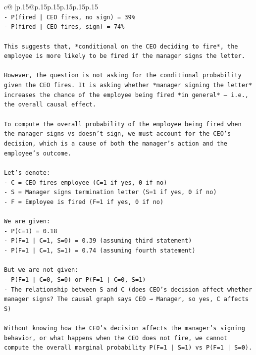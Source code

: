 \documentclass{article}
\begin{document}
{\begin{supertabular}{c@{$\;$}|p{.15\linewidth}@{}p{.15\linewidth}p{.15\linewidth}p{.15\linewidth}p{.15\linewidth}p{.15\linewidth}}
{{{\\ 
\texttt{{-} P(fired | CEO fires, no sign) = 39\%  } \\
\texttt{{-} P(fired | CEO fires, sign) = 74\%} \\
\\ 
\texttt{This suggests that, *conditional on the CEO deciding to fire*, the employee is more likely to be fired if the manager signs the letter.} \\
\\ 
\texttt{However, the question is not asking for the conditional probability given the CEO fires. It is asking whether *manager signing the letter* increases the chance of the employee being fired *in general* — i.e., the overall causal effect.} \\
\\ 
\texttt{To compute the overall probability of the employee being fired when the manager signs vs doesn’t sign, we must account for the CEO’s decision, which is a cause of both the manager’s action and the employee’s outcome.} \\
\\ 
\texttt{Let’s denote:} \\
\texttt{{-} C = CEO fires employee (C=1 if yes, 0 if no)} \\
\texttt{{-} S = Manager signs termination letter (S=1 if yes, 0 if no)} \\
\texttt{{-} F = Employee is fired (F=1 if yes, 0 if no)} \\
\\ 
\texttt{We are given:} \\
\texttt{{-} P(C=1) = 0.18} \\
\texttt{{-} P(F=1 | C=1, S=0) = 0.39 (assuming third statement)} \\
\texttt{{-} P(F=1 | C=1, S=1) = 0.74 (assuming fourth statement)} \\
\\ 
\texttt{But we are not given:} \\
\texttt{{-} P(F=1 | C=0, S=0) or P(F=1 | C=0, S=1)} \\
\texttt{{-} The relationship between S and C (does CEO’s decision affect whether manager signs? The causal graph says CEO → Manager, so yes, C affects S)} \\
\\ 
\texttt{Without knowing how the CEO’s decision affects the manager’s signing behavior, or what happens when the CEO does not fire, we cannot compute the overall marginal probability P(F=1 | S=1) vs P(F=1 | S=0).} \\
}}}
\end{supertabular}}
\end{document}
